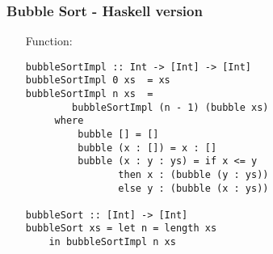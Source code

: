 \documentclass[final,handout]{beamer}
\begin{document}
\begin{frame}[fragile]
\begin{itemize}
{                
                ~\\
                
                ~
                ~~~~~~~~~~~~~~
                ~~~~~~~~~~~~~~
                ~~~~~~~~~~~~~~~\\

                ~\\
        }
    \end{itemize}
\end{frame}

\begin{frame}[fragile]
    \frametitle{Bubble Sort - Haskell version}

    \begin{itemize}
        \item[Function:]
            \begin{verbatim}
bubbleSortImpl :: Int -> [Int] -> [Int]
bubbleSortImpl 0 xs  = xs 
bubbleSortImpl n xs  =
        bubbleSortImpl (n - 1) (bubble xs)
     where
         bubble [] = []
         bubble (x : []) = x : []
         bubble (x : y : ys) = if x <= y
                then x : (bubble (y : ys))
                else y : (bubble (x : ys))

bubbleSort :: [Int] -> [Int]
bubbleSort xs = let n = length xs 
    in bubbleSortImpl n xs
    \end{verbatim}
    \end{itemize}
\end{frame}
\end{document}
